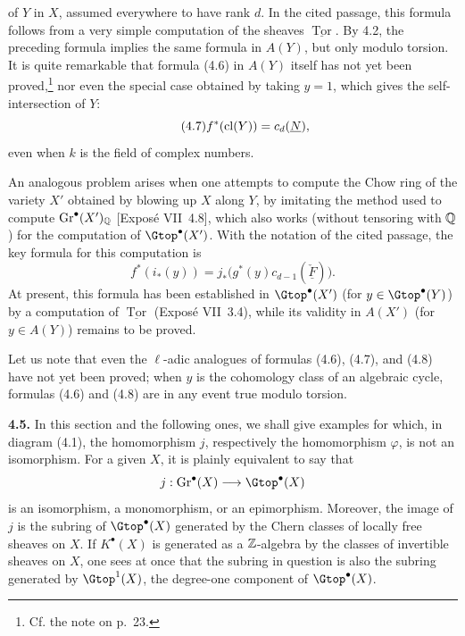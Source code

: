 of $Y$ in $X$, assumed everywhere to have rank $d$. In the cited passage,
this formula follows from a very simple computation of the sheaves
$\underline{\operatorname{Tor}}$. By 4.2, the preceding formula implies the
same formula in $A(Y)$, but only modulo torsion. It is quite remarkable that
formula (4.6) in $A(Y)$ itself has not yet been proved,\footnote{Cf. the note
on p.~23.} nor even the special case obtained by taking $y=1$, which gives
the self-intersection of $Y$:
\begin{equation*}\tag{4.7}
 f^*(\operatorname{cl}(Y))=c_d(\underline{N}),
\end{equation*}
even when $k$ is the field of complex numbers.

An analogous problem arises when one attempts to compute the Chow ring of
the variety $X'$ obtained by blowing up $X$ along $Y$, by imitating the
method used to compute $\operatorname{Gr}^\bullet(X')_{\mathbb Q}$
[Exposé VII~4.8], which also works (without tensoring with $\mathbb Q$) for the
computation of $\Gtop^\bullet(X')$. With the notation of the cited passage,
the key formula for this computation is
\begin{equation*}\tag{4.8}
 f^*(i_*(y))
   =j_*\bigl(g^*(y)c_{d-1}(\check{\underline{F}})\bigr).
\end{equation*}
At present, this formula has been established in $\Gtop^\bullet(X')$ (for
$y\in\Gtop^\bullet(Y)$) by a computation of
$\underline{\operatorname{Tor}}$ (Exposé VII~3.4), while its validity in
$A(X')$ (for $y\in A(Y)$) remains to be proved.

Let us note that even the $\ell$-adic analogues of formulas (4.6), (4.7),
and (4.8) have not yet been proved; when $y$ is the cohomology class of an
algebraic cycle, formulas (4.6) and (4.8) are in any event true modulo
torsion.

\noindent\textbf{4.5.}
In this section and the following ones, we shall give examples for which,
in diagram (4.1), the homomorphism $j$, respectively the homomorphism
$\varphi$, is not an isomorphism. For a given $X$, it is plainly equivalent
to say that
\[
 j:\operatorname{Gr}^\bullet(X)\longrightarrow\Gtop^\bullet(X)
\]
is an isomorphism, a monomorphism, or an epimorphism. Moreover, the image of
$j$ is the subring of $\Gtop^\bullet(X)$ generated by the Chern classes of
locally free sheaves on $X$. If $K^\bullet(X)$ is generated as a
$\mathbb Z$-algebra by the classes of invertible sheaves on $X$, one sees at once
that the subring in question is also the subring generated by
$\Gtop^1(X)$, the degree-one component of $\Gtop^\bullet(X)$.


